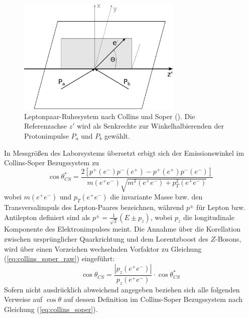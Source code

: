 \begin{figure}
    \centering
    \includegraphics[width=0.7\textwidth]{img/collins_soper}
    \caption[Leptonpaar-Ruhesystem nach Collins und Soper]
        {Leptonpaar-Ruhesystem nach Collins und Soper (\cite{Collins:1977iv}).
        Die Referenzachse $z'$ wird als Senkrechte zur Winkelhalbierenden der
        Protonimpulse $P_a$ und $P_b$ gewählt.}
    \label{fig:collins_soper}
\end{figure}

In Messgrößen des Laborsystems übersetzt erbigt sich der Emissionswinkel im
Collins-Soper Bezugssystem zu
\begin{equation}
    \cos\theta^*_{CS} = \frac{2\left[ p^+(e^-)p^-(e^+)-p^+(e^+)p^-(e^-)\right]}
        {m(e^+e^-) \sqrt{m^2(e^+e^-)+p_T^2(e^+e^-)}}
    \label{eq:collins_soper_raw}
\end{equation}
wobei $m(e^+e^-)$ und $p_T(e^+e^-)$ die invariante Masse bzw. den
Transversalimpuls des Lepton-Paares bezeichnen, während $p^\pm$ für Lepton bzw.
Antilepton definiert sind als $p^\pm = \tfrac{1}{\sqrt{2}}(E\pm p_z)$, wobei
$p_z$ die longitudinale Komponente des Elektronimpulses meint. Die Annahme über
die Korellation zwischen ursprünglicher Quarkrichtung und dem Lorentzboost des
$Z$-Bosons, wird über einen Vorzeichen wechselnden Vorfaktor zu Gleichung
(\ref{eq:collins_soper_raw}) eingeführt:
\begin{equation}
    \cos\theta_{CS} = \frac{|p_z(e^+e^-)|}{p_z(e^+e^-)} \cdot \cos\theta^*_{CS}
    \label{eq:collins_soper}
\end{equation}
Sofern nicht ausdrücklich abweichend angegeben beziehen sich alle folgenden
Verweise auf $\cos\theta$ auf dessen Definition im Collins-Soper Bezugssystem
nach Gleichung (\ref{eq:collins_soper}).







